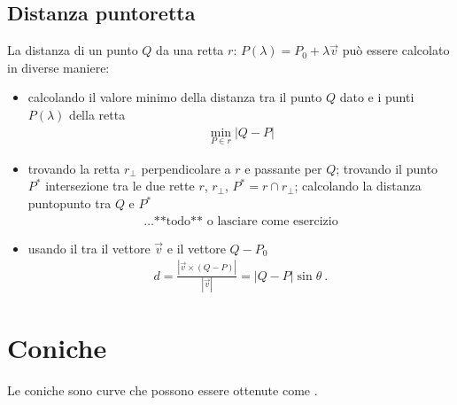 \documentclass[letterpaper,10pt,italian]{jupyterBook}
\begin{document}
\subsection{Distanza punto\sphinxhyphen{}retta}
\label{\detokenize{ch/analytic_geometry/analytic_geometry_2d/lines:distanza-punto-retta}}\label{\detokenize{ch/analytic_geometry/analytic_geometry_2d/lines:geometry-analytic-2d-lines-distance-point-line}}
\sphinxAtStartPar
La distanza di un punto \(Q\) da una retta \(r: \, P(\lambda) =  P_0 + \lambda \vec{v}\) può essere calcolato in diverse maniere:
\begin{itemize}
\item {} 
\sphinxAtStartPar
calcolando il valore minimo della distanza tra il punto \(Q\) dato e i punti \(P(\lambda)\) della retta
\begin{equation*}
\begin{split}\min_{P \in r} |Q - P|\end{split}
\end{equation*}
\item {} 
\sphinxAtStartPar
trovando la retta \(r_{\perp}\) perpendicolare a \(r\) e passante per \(Q\); trovando il punto \(P^*\) intersezione tra le due rette \(r\), \(r_{\perp}\), \(P^* = r \cap r_{\perp}\); calcolando la distanza punto\sphinxhyphen{}punto tra \(Q\) e \(P^*\)
\begin{equation*}
\begin{split} \dots \text{**todo** o lasciare come esercizio}\end{split}
\end{equation*}
\item {} 
\sphinxAtStartPar
usando il {\hyperref[\detokenize{ch/algebra/vector-algebra-euclidean-space:math-hs-algebra-vector-euclidean-space-inner-product}]{}} tra il vettore \(\vec{v}\) e il vettore \(Q-P_0\)
\begin{equation*}
\begin{split}d = \frac{|\vec{v} \times (Q-P)|}{|\vec{v}|} = |Q - P| \sin \theta \ .\end{split}
\end{equation*}
\end{itemize}

\sphinxstepscope


\section{Coniche}
\label{\detokenize{ch/analytic_geometry/analytic_geometry_2d/conics:coniche}}\label{\detokenize{ch/analytic_geometry/analytic_geometry_2d/conics:geometry-analytic-2d-conics}}\label{\detokenize{ch/analytic_geometry/analytic_geometry_2d/conics::doc}}
\sphinxAtStartPar
Le coniche sono curve che possono essere ottenute come {\hyperref[\detokenize{ch/analytic_geometry/analytic_geometry_3d/cone:geometry-analytic-3d-cone-conics}]{}}.
\end{document}
